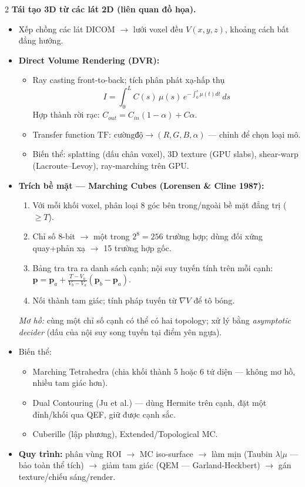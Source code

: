 \begin{paracol}{2}
\textbf{Tái tạo 3D từ các lát 2D (liên quan đồ họa).}
\begin{itemize}[leftmargin=*,nosep]
  \item Xếp chồng các lát DICOM $\to$ lưới voxel đều $V(x,y,z)$, khoảng cách bất đẳng hướng.
  \item \textbf{Direct Volume Rendering (DVR):}
    \begin{itemize}[leftmargin=*,nosep]
      \item Ray casting front-to-back; tích phân phát xạ-hấp thụ
      $$I=\int_0^L C(s)\,\mu(s)\,e^{-\int_0^s\mu(t)dt}\,ds$$
      Hợp thành rời rạc: $C_{out}=C_{in}(1-\alpha)+C\alpha$.
      \item Transfer function $\mathrm{TF}:\,\mathrm{cường độ}\to(R,G,B,\alpha)$ — chỉnh để chọn loại mô.
      \item Biến thể: splatting (dấu chân voxel), 3D texture (GPU slabs), shear-warp (Lacroute–Levoy), ray-marching trên GPU.
    \end{itemize}
  \item \textbf{Trích bề mặt — Marching Cubes (Lorensen \& Cline 1987):}
    \begin{enumerate}[leftmargin=*,nosep]
      \item Với mỗi khối voxel, phân loại 8 góc bên trong/ngoài bề mặt đẳng trị ($\geq T$).
      \item Chỉ số 8-bit $\to$ một trong $2^8=256$ trường hợp; dùng đối xứng quay+phản xạ $\to$ 15 trường hợp gốc.
      \item Bảng tra tra ra danh sách cạnh; nội suy tuyến tính trên mỗi cạnh:
      $\mathbf p=\mathbf p_a+\frac{T-V_a}{V_b-V_a}(\mathbf p_b-\mathbf p_a)$.
      \item Nối thành tam giác; tính pháp tuyến từ $\nabla V$ để tô bóng.
    \end{enumerate}
    \emph{Mơ hồ:} cùng một chỉ số cạnh có thể có hai topology; xử lý bằng \emph{asymptotic decider} (dấu của nội suy song tuyến tại điểm yên ngựa).
  \item Biến thể:
    \begin{itemize}[leftmargin=*,nosep]
      \item Marching Tetrahedra (chia khối thành 5 hoặc 6 tứ diện — không mơ hồ, nhiều tam giác hơn).
      \item Dual Contouring (Ju et al.) — dùng Hermite trên cạnh, đặt một đỉnh/khối qua QEF, giữ được cạnh sắc.
      \item Cuberille (lập phương), Extended/Topological MC.
    \end{itemize}
  \item \textbf{Quy trình:} phân vùng ROI $\to$ MC iso-surface $\to$ làm mịn (Taubin $\lambda|\mu$ — bảo toàn thể tích) $\to$ giảm tam giác (QEM — Garland-Heckbert) $\to$ gán texture/chiếu sáng/render.
\end{itemize}


\end{paracol}
